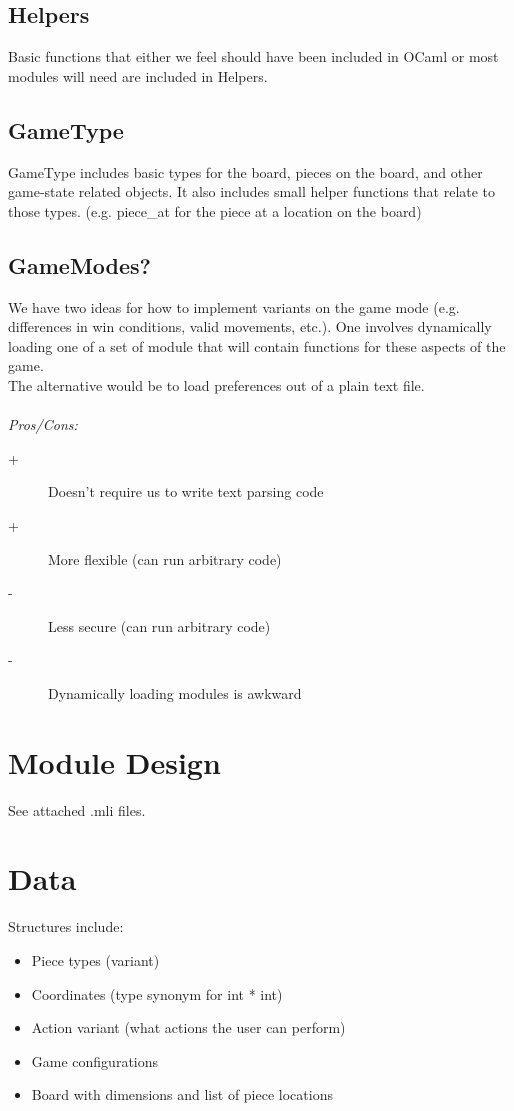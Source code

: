 \documentclass[11pt, oneside]{article}
\begin{document}
\begin{enumerate}
\subsection{Helpers}
Basic functions that either we feel should have been included in OCaml or most
modules will need are included in Helpers.

\subsection{GameType}
GameType includes basic types for the board, pieces on the board, and other
game-state related objects. It also includes small helper functions that relate
to those types. (e.g. piece\_at for the piece at a location on the board)

\subsection{GameModes?}
We have two ideas for how to implement variants on the game mode (e.g.
differences in win conditions, valid movements, etc.). One involves dynamically
loading one of a set of module that will contain functions for these aspects of
the game.\\
The alternative would be to load preferences out of a plain text file.\\\\
\textit{Pros/Cons:}
\begin{description}
\item[+] Doesn't require us to write text parsing code
\item[+] More flexible (can run arbitrary code)
\item[-] Less secure (can run arbitrary code)
\item[-] Dynamically loading modules is awkward
\end{description}

\section{Module Design}
See attached .mli files.

\section{Data}
Structures include:
\begin{itemize}
\item Piece types (variant)
\item Coordinates (type synonym for int * int)
\item Action variant (what actions the user can perform)
\item Game configurations
\item Board with dimensions and list of piece locations
\end{itemize}


\end{enumerate}
\end{document}
